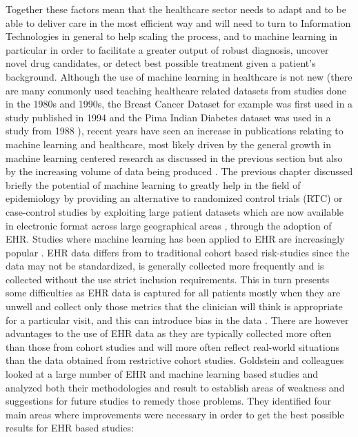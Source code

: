 Together these factors  mean that the healthcare sector needs to adapt and to be able to deliver care in the most efficient way and will need to turn to Information Technologies in general to help scaling the process, and to machine learning in particular in order to facilitate a greater output of robust diagnosis, uncover novel drug candidates, or detect best possible treatment given a patient's background.\newline
\newline
Although the use of machine learning in healthcare is not new (there are many commonly used teaching healthcare related datasets from studies done in the 1980s and 1990s, the Breast Cancer Dataset for example was first used in a study published in 1994 \citep{OLMangasarian:1994ue} and the Pima Indian Diabetes dataset was used in a study from 1988 \citep{Smith:1988wy}), recent years have seen an increase in publications relating to machine learning and healthcare, most likely driven by the general growth in machine learning centered research as discussed in the previous section but also by the increasing volume of data being produced \citep{Pesapane:2018kv}.\newline
The previous chapter discussed briefly the potential of machine learning to greatly help in the field of epidemiology by providing an alternative to randomized control trials (RTC) or case-control studies by exploiting large patient datasets which are now available in electronic format across large geographical areas \citep{Callahan:2017bz}, through the adoption of EHR. Studies where machine learning has been applied to EHR are increasingly popular \citep{Goldstein:2017bk}. \newline 
EHR data differs from to traditional cohort based risk-studies since the data may not be standardized, is generally collected more frequently and is collected without the use strict inclusion requirements. This in turn presents some difficulties as EHR data is captured for all patients mostly when they are unwell and collect only those metrics that the clinician will think is appropriate for a particular visit, and this can introduce bias in the data \citep{Hersh:2013gp}. \newline 
There are however advantages to the use of EHR data as they are typically collected more often than those from cohort studies and will more often reflect real-world situations than the data obtained from restrictive cohort studies. Goldstein and colleagues looked at a large number of EHR and machine learning based studies and analyzed both their methodologies and result to  establish areas of weakness and suggestions for future studies to remedy those problems. They identified four main areas where improvements were necessary in order to get the best possible results for EHR based studies: 
